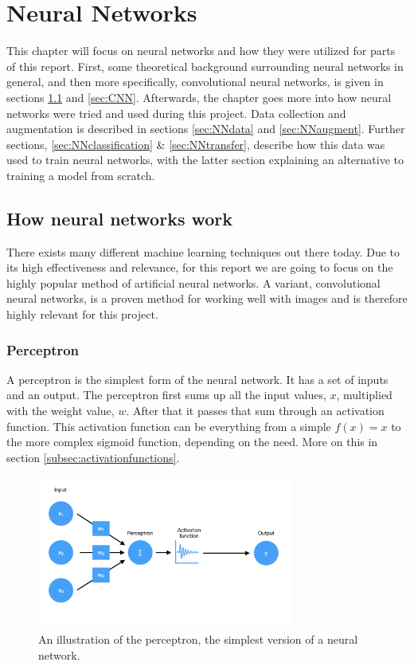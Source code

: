 \chapter{Neural Networks}
This chapter will focus on neural networks and how they were utilized for parts of this
report. First, some theoretical background surrounding neural networks in general, and then
more specifically, convolutional neural networks, is given in sections \ref{sec:NNwork}
and \ref{sec:CNN}.
Afterwards, the chapter goes more into how neural networks were tried and used during this project. Data collection and augmentation is described in sections \ref{sec:NNdata} and \ref{sec:NNaugment}. Further sections, \ref{sec:NNclassification} \& \ref{sec:NNtransfer}, describe how this data was used to train neural networks, with the latter section explaining an alternative to training a model from scratch. 
\section{How neural networks work}
\label{sec:NNwork}
There exists many different machine learning techniques out there today. Due to its high 
effectiveness and relevance, for this report we are going to focus on the highly popular 
method of artificial neural networks.
A variant, convolutional neural networks, is a proven method for working well with 
images and is therefore highly relevant for this project.

\subsection{Perceptron}
A perceptron is the simplest form of the neural network. It has a set of inputs and an output.
The perceptron first sums up all the input values, $x$, multiplied with the weight value, $w$.
After that it passes that sum through an activation function. This activation function can be everything from a simple $f(x)=x$ to the more complex sigmoid function, depending on the need. More on this in section \ref{subsec:activationfunctions}.

\begin{figure}[hbtp]
\begin{center}
\includegraphics[width = 0.75\textwidth]{./Images/perceptron.jpg} 
\caption{An illustration of the perceptron, the simplest version of a neural network.}
\end{center}
\end{figure}

